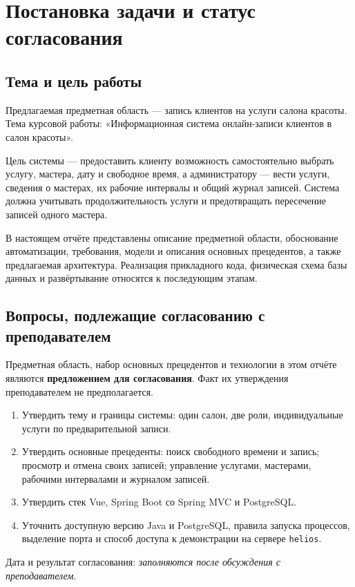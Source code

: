 \section{Постановка задачи и статус согласования}
\subsection{Тема и цель работы}
Предлагаемая предметная область --- запись клиентов на услуги салона красоты. Тема курсовой работы: «Информационная система онлайн-записи клиентов в салон красоты».

Цель системы --- предоставить клиенту возможность самостоятельно выбрать услугу, мастера, дату и свободное время, а администратору --- вести услуги, сведения о мастерах, их рабочие интервалы и общий журнал записей. Система должна учитывать продолжительность услуги и предотвращать пересечение записей одного мастера.

В настоящем отчёте представлены описание предметной области, обоснование автоматизации, требования, модели и описания основных прецедентов, а также предлагаемая архитектура. Реализация прикладного кода, физическая схема базы данных и развёртывание относятся к последующим этапам.

\subsection{Вопросы, подлежащие согласованию с преподавателем}
Предметная область, набор основных прецедентов и технологии в этом отчёте являются \textbf{предложением для согласования}. Факт их утверждения преподавателем не предполагается.
\begin{enumerate}
\item Утвердить тему и границы системы: один салон, две роли, индивидуальные услуги по предварительной записи.
\item Утвердить основные прецеденты: поиск свободного времени и запись; просмотр и отмена своих записей; управление услугами, мастерами, рабочими интервалами и журналом записей.
\item Утвердить стек Vue, Spring Boot со Spring MVC и PostgreSQL.
\item Уточнить доступную версию Java и PostgreSQL, правила запуска процессов, выделение порта и способ доступа к демонстрации на сервере \texttt{helios}.
\end{enumerate}
Дата и результат согласования: \textit{заполняются после обсуждения с преподавателем}.

